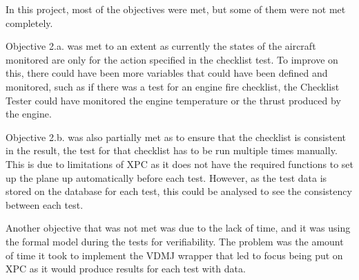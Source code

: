 \documentclass[../dissertation.tex]{subfiles}
\begin{document}
In this project, most of the objectives were met, but some of them were not
met completely.

Objective 2.a. was met to an extent as currently the states of the aircraft monitored
are only for the action specified in the checklist test. To improve on this,
there could have been more variables that could have been defined and monitored,
such as if there was a test for an engine fire checklist, the Checklist Tester could
have monitored the engine temperature or the thrust produced by the engine.

Objective 2.b. was also partially met as to ensure that the checklist is consistent in the
result, the test for that checklist has to be run multiple times manually. This is due
to limitations of XPC as it does not have the required functions to set up the plane up
automatically before each test. However, as the test data is stored on the database for
each test, this could be analysed to see the consistency between each test.

Another objective that was not met was due to the lack of time, and it was using the formal
model during the tests for verifiability. The problem was the amount of time it took
to implement the VDMJ wrapper that led to focus being put on XPC as it would produce
results for each test with data.
\end{document}
